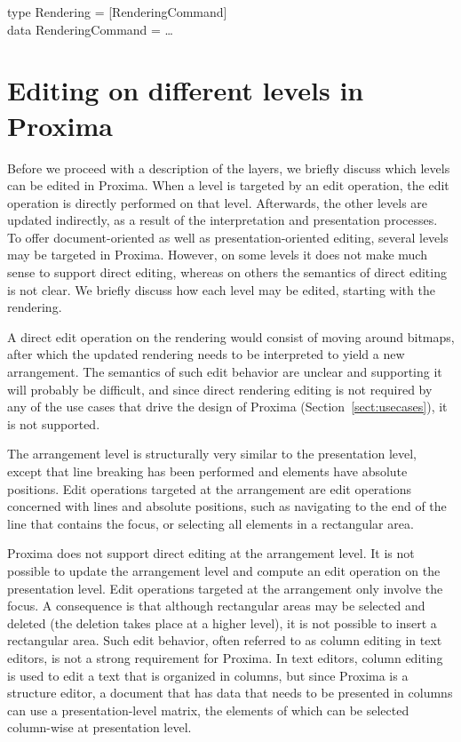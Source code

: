 \noindent
\ttfamily
\begin{tabbing}
type Rendering = [RenderingCommand]\\
data RenderingCommand = \dots
\end{tabbing}
\rmfamily




%																
%																
%																
\section{Editing on different levels in Proxima}

Before we proceed with a description of the layers, we briefly discuss which levels can be edited in Proxima. When a level is targeted by an edit operation, the edit operation is directly performed on that level. Afterwards, the other levels are updated indirectly, as a result of the interpretation and presentation processes. To offer document-oriented as well as presentation-oriented editing, several levels may be targeted in Proxima. However, on some levels it does not make much sense to support direct editing, whereas on others the semantics of direct editing is not clear. We briefly discuss how each level may be edited, starting with the rendering.


A direct edit operation on the rendering would consist of moving around bitmaps, after which the updated rendering needs to be interpreted to yield a new arrangement. The semantics of such edit behavior are unclear and supporting it will probably be difficult, and since direct rendering editing is not required by any of the use cases that drive the design of Proxima (Section~\ref{sect:usecases}), it is not supported.
  
  
\bc
The arrangement level is structurally very similar to the presentation level, except that line breaking has been performed and elements have absolute positions. Edit operations targeted at the arrangement are edit operations concerned with lines and absolute positions, such as navigating to the end of the line that contains the focus, or selecting all elements in a rectangular area.
\ec


Proxima does not support direct editing at the arrangement level. It is not possible to update the arrangement level and compute an edit operation on the presentation level. Edit operations targeted at the arrangement only involve the focus. A consequence is that although rectangular areas may be selected and deleted (the deletion takes place at a higher level), it is not possible to insert a rectangular area. Such edit behavior, often referred to as column editing in text editors, is not a strong requirement for Proxima. In text editors, column editing is used to edit a text that is organized in columns, but since Proxima is a structure editor, a document that has data that needs to be presented in columns can use a presentation-level matrix, the elements of which can be selected column-wise at presentation level.


